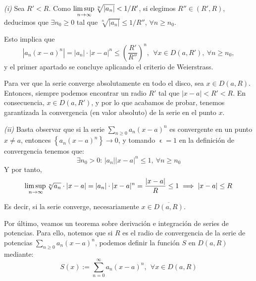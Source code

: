 \documentclass[11pt, a4paper]{article}
\makeatletter
\newif\IfInSansMode
\let\oldsf\sffamily
\renewcommand*{\sffamily}{\oldsf\mathversion{sans}\InSansModetrue}
\let\oldnorm\normalfont
\renewcommand*{\normalfont}{\oldnorm\InSansModefalse\mathversion{normal}}
\let\epsilon\upvarepsilon
\renewenvironment{proof}[1][\proofname] {\par\pushQED{\qed}\normalfont\topsep6\p@\@plus6\p@\relax\trivlist\item[\hskip\labelsep\itshape\sffamily#1\@addpunct{.}]\ignorespaces}{\popQED\endtrivlist\@endpefalse}
\theoremstyle{theorem-style}
\theoremstyle{definition-style}
\theoremstyle{remark-style}
\theoremstyle{example-style}
\makeatother
\begin{document}
  \begin{proof} \hfill \\
    \textit{(i)} Sea $R'<R$. Como $\underset{n\to\infty}{\mbox{lim\,sup\,}} \sqrt[n]{|a_n|} < 1/R'$, si elegimos $R''\in (R',R)$, deducimos que $\exists n_0\geq 0$ tal que $\sqrt[n]{|a_n|} \leq 1/R''$, $\forall n\geq n_0$.

    Esto implica que
    \[
      \left| a_n (x-a)^n\right| = |a_n|\cdot|x-a|^n \leq \left(\frac{R'}{R''}\right)^n, \ \ \forall x\in D(a,R'), \ \forall n\geq n_0,
    \]
    y el primer apartado se concluye aplicando el criterio de Weierstrass.

    Para ver que la serie converge absolutamente en todo el disco, sea $x \in D(a,R)$. Entonces, siempre podemos encontrar un radio $R'$ tal que $|x-a| < R' < R$. En consecuencia, $x \in D(a,R')$, y por lo que acabamos de probar, tenemos garantizada la convergencia (en valor absoluto) de la serie en el punto $x$. 

    \textit{(ii)} Basta observar que si la serie $\sum_{n\geq 0} a_n (x-a)^n$ es convergente en un punto $x\not= a$, entonces $\left\{ a_n (x-a)^n \right\} \to 0$, y tomando $\epsilon = 1$ en la definición de convergencia tenemos que:
    \[
      \exists n_0>0: \,  |a_n| |x-a|^n \leq 1, \ \forall n\geq n_0
    \]
    Y por tanto, $$\underset{n\to\infty}{\mbox{lim\,sup\,}} \sqrt[n]{a_n} \cdot |x-a| = |a_n| \cdot |x-a|^n =\frac{|x-a|}{R} \leq 1 \implies |x-a| \le R$$

    Es decir, si la serie converge, necesariamente $x \in \overline{D(a,R)}.$
  \end{proof}

Por último, veamos un teorema sobre derivación e integración de series de potencias. Para ello, notemos que si $R$ es el radio de convergencia de la serie de potencias $\displaystyle\sum_{n\geq 0} a_n (x-a)^n$, podemos definir la función $S$ en $D(a,R)$ mediante: \[ 
  S(x):= \sum_{n= 0}^\infty a_n (x-a)^n
  , \ \ \forall x\in  D(a,R)
\] 
\end{document}
